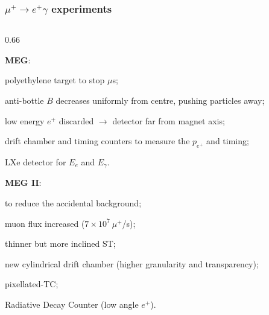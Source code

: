 \documentclass{beamer}
\begin{document}
    \begin{frame}
        \frametitle{$\mu^+ \rightarrow e^+ \gamma$ experiments}
        \vspace{-3mm}
\begin{columns}
 \begin{column}{0.66\framewidth}
 \setlength{\leftmargini}{1.1em}
    \begin{itemize}
   {\small     \item  \textbf{MEG}:}
         \begin{itemize}
             {\small 
             \item polyethylene target to stop $\mu$s;
             \vspace{0.5mm}
            \item anti-bottle $B$ decreases uniformly from centre, pushing particles away; 
            \vspace{0.5mm}
            \item low energy $e^+$ discarded $\rightarrow$ detector far from magnet axis;
            \vspace{0.5mm}
            \item drift chamber and timing counters to measure the $p_{e^+}$ and timing;
            \vspace{0.5mm}
            \item LXe detector for $E_e$ and $E_\gamma$.
            }
   \end{itemize}
   {\small      \item  \textbf{MEG II}:}
               \begin{itemize}
                {\small \item to reduce the accidental background;
                \vspace{0.5mm}
                \item muon flux increased ({\footnotesize$7 \times 10^7 \ \mu^+$/s});
                \vspace{0.5mm}
                \item thinner but more inclined ST;
                \vspace{0.5mm}
                \item new cylindrical drift chamber (higher granularity and transparency);
                \vspace{0.5mm}
                \item pixellated-TC;
                \vspace{0.5mm}
                \item Radiative Decay Counter (low angle $e^+$).
}
\end{itemize}
\end{itemize}
\end{column}
\end{columns}
\end{frame}
\end{document}
